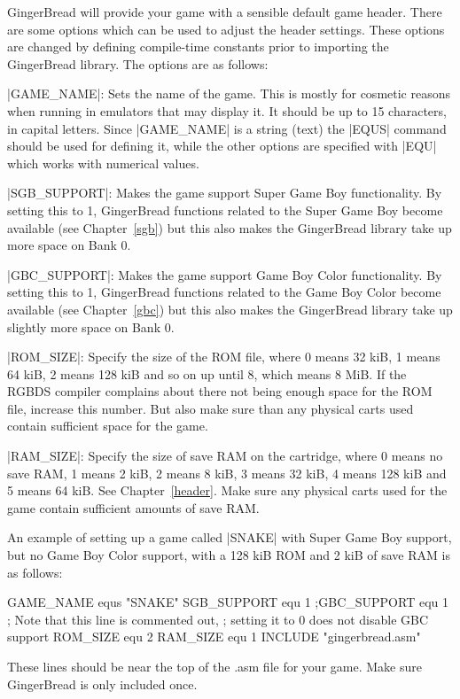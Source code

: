 \documentclass[11pt]{book}
\begin{document}
GingerBread will provide your game with a sensible default game header. There are some options which can be used to adjust the header settings. These options are changed by defining compile-time constants prior to importing the GingerBread library. The options are as follows:

|GAME_NAME|: Sets the name of the game. This is mostly for cosmetic reasons when running in emulators that may display it. It should be up to 15 characters, in capital letters. Since |GAME_NAME| is a string (text) the |EQUS| command should be used for defining it, while the other options are specified with |EQU| which works with numerical values.

|SGB_SUPPORT|: Makes the game support Super Game Boy functionality. By setting this to 1, GingerBread functions related to the Super Game Boy become available (see Chapter~\ref{sgb}) but this also makes the GingerBread library take up more space on Bank 0.

|GBC_SUPPORT|: Makes the game support Game Boy Color functionality. By setting this to 1, GingerBread functions related to the Game Boy Color become available (see Chapter~\ref{gbc}) but this also makes the GingerBread library take up slightly more space on Bank 0. 

|ROM_SIZE|: Specify the size of the ROM file, where 0 means 32 kiB, 1 means 64 kiB, 2 means 128 kiB and so on up until 8, which means 8 MiB. If the RGBDS compiler complains about there not being enough space for the ROM file, increase this number. But also make sure than any physical carts used contain sufficient space for the game.

|RAM_SIZE|: Specify the size of save RAM on the cartridge, where 0 means no save RAM, 1 means 2 kiB, 2 means 8 kiB, 3 means 32 kiB, 4 means 128 kiB and 5 means 64 kiB. See Chapter~\ref{header}. Make sure any physical carts used for the game contain sufficient amounts of save RAM.

An example of setting up a game called |SNAKE| with Super Game Boy support, but no Game Boy Color support, with a 128 kiB ROM and 2 kiB of save RAM is as follows:

\begin{code}
GAME_NAME equs "SNAKE"
SGB_SUPPORT equ 1
;GBC_SUPPORT equ 1 ; Note that this line is commented out, 
; setting it to 0 does not disable GBC support
ROM_SIZE equ 2
RAM_SIZE equ 1
INCLUDE "gingerbread.asm"
\end{code}

These lines should be near the top of the .asm file for your game. Make sure GingerBread is only included once.
 
\end{document}

